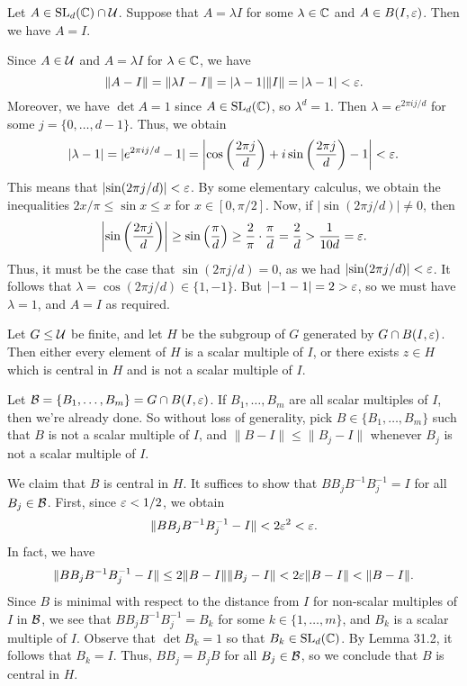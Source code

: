 \begin{lemma}{}
    Let $A \in \operatorname{SL}_d(\mathbb{C}) \cap {\cal U}$. Suppose that $A = \lambda I$ for some 
    $\lambda \in \mathbb{C}$ and $A \in B(I, \varepsilon)$. Then we have $A = I$. 
\end{lemma}
\begin{pf}
    Since $A \in {\cal U}$ and $A = \lambda I$ for $\lambda \in \mathbb{C}$, we have 
    \[ \|A - I\| = \|\lambda I - I\| = |\lambda - 1|\|I\| = |\lambda - 1| < \varepsilon. \] 
    Moreover, we have $\det A = 1$ since $A \in \operatorname{SL}_d(\mathbb{C})$, so $\lambda^d = 1$.
    Then $\lambda = e^{2\pi ij/d}$ for some $j = \{0, \dots, d-1\}$. Thus, 
    we obtain 
    \[ |\lambda - 1| = |e^{2\pi ij/d} - 1| 
    = \left| \cos\left(\frac{2\pi j}d\right) + i\sin\left(\frac{2\pi j}d\right) - 1 \right| 
    < \varepsilon. \] 
    This means that $\lvert\sin(2\pi j/d)\rvert < \varepsilon$. By some elementary calculus, 
    we obtain the inequalities $2x/\pi \leq \sin x \leq x$ for 
    $x \in [0, \pi/2]$. Now, if $\lvert\sin(2\pi j/d)\rvert \neq 0$, then 
    \[ \left| \sin\left( \frac{2\pi j}d \right) \right| 
    \geq \sin\left( \frac{\pi}{d} \right) \geq \frac{2}{\pi} \cdot 
    \frac{\pi}{d} = \frac{2}{d} > \frac{1}{10d} = \varepsilon. \] 
    Thus, it must be the case that $\sin(2\pi j/d) = 0$, as 
    we had $\lvert\sin(2\pi j/d)\rvert < \varepsilon$. It follows that 
    $\lambda = \cos(2\pi j/d) \in \{1, -1\}$. But $\lvert -1-1\rvert = 2 > \varepsilon$, 
    so we must have $\lambda = 1$, and $A = I$ as required. 
\end{pf}

\begin{lemma}{}
    Let $G \leq {\cal U}$ be finite, and let $H$ be the subgroup of $G$
    generated by $G \cap B(I, \varepsilon)$. Then either every element of $H$ 
    is a scalar multiple of $I$, or there exists $z \in H$ which is central 
    in $H$ and is not a scalar multiple of $I$. 
\end{lemma}
\begin{pf}
    Let ${\cal B} = \{B_1, \dots, B_m\} = G \cap B(I, \varepsilon)$. If $B_1, 
    \dots, B_m$ are all scalar multiples of $I$, then we're already done. 
    So without loss of generality, pick $B \in \{B_1, \dots, B_m\}$ 
    such that $B$ is not a scalar multiple of $I$, and $\|B - I\| \leq 
    \|B_j - I\|$ whenever $B_j$ is not a scalar multiple of $I$. 

    We claim that $B$ is central in $H$. It suffices to show that 
    $BB_jB^{-1}B_j^{-1} = I$ for all $B_j \in {\cal B}$. First, since 
    $\varepsilon < 1/2$, we obtain 
    \[ \|BB_jB^{-1}B_j^{-1} - I\| < 2\varepsilon^2 < \varepsilon. \] 
    In fact, we have 
    \[ \|BB_jB^{-1}B_j^{-1} - I\| \leq 2\|B - I\|\|B_j - I\| < 
    2\varepsilon\|B - I\| < \|B - I\|. \] 
    Since $B$ is minimal with respect to the distance from $I$ for 
    non-scalar multiples of $I$ in ${\cal B}$, we see that 
    $BB_jB^{-1}B_j^{-1} = B_k$ for some $k \in \{1, \dots, m\}$, 
    and $B_k$ is a scalar multiple of $I$. Observe that $\det B_k = 1$ 
    so that $B_k \in \operatorname{SL}_d(\mathbb{C})$. By Lemma 31.2, it follows that $B_k = I$. 
    Thus, $BB_j = B_jB$ for all $B_j \in {\cal B}$, so 
    we conclude that $B$ is central in $H$. 
\end{pf}

